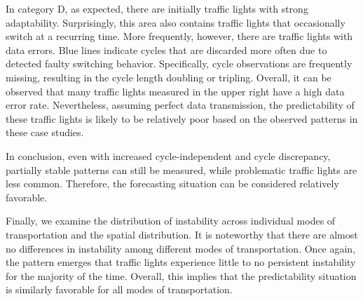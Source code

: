 In category D, as expected, there are initially traffic lights with strong adaptability. Surprisingly, this area also contains traffic lights that occasionally switch at a recurring time. More frequently, however, there are traffic lights with data errors. Blue lines indicate cycles that are discarded more often due to detected faulty switching behavior. Specifically, cycle observations are frequently missing, resulting in the cycle length doubling or tripling. Overall, it can be observed that many traffic lights measured in the upper right have a high data error rate. Nevertheless, assuming perfect data transmission, the predictability of these traffic lights is likely to be relatively poor based on the observed patterns in these case studies.

In conclusion, even with increased cycle-independent and cycle discrepancy, partially stable patterns can still be measured, while problematic traffic lights are less common. Therefore, the forecasting situation can be considered relatively favorable.

Finally, we examine the distribution of instability across individual modes of transportation and the spatial distribution. It is noteworthy that there are almost no differences in instability among different modes of transportation. Once again, the pattern emerges that traffic lights experience little to no persistent instability for the majority of the time. Overall, this implies that the predictability situation is similarly favorable for all modes of transportation.

